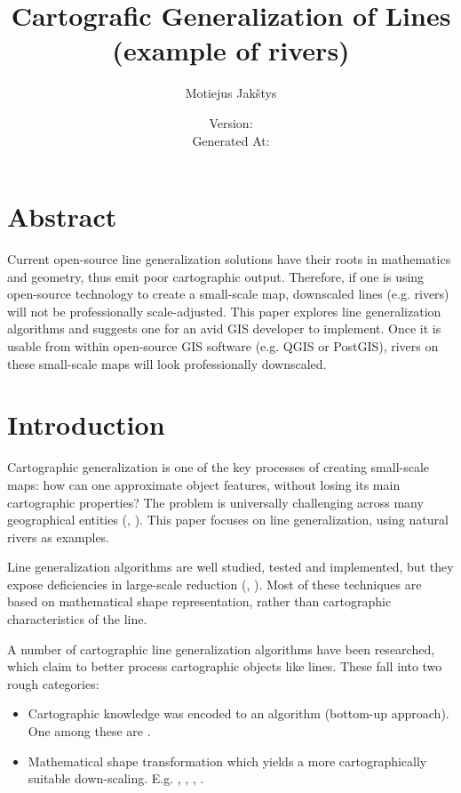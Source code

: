 \documentclass[a4paper]{article}
\title{
    Cartografic Generalization of Lines \\
    (example of rivers) \\ \vspace{4mm}
}
\author{Motiejus Jakštys}
\date{
    \vspace{10mm}
    Version: \VCDescribe \\ \vspace{4mm}
    Generated At: \GeneratedAt
}
\begin{document}
\maketitle

\newpage

\section{Abstract}
\label{sec:abstract}

Current open-source line generalization solutions have their roots in
mathematics and geometry, thus emit poor cartographic output. Therefore, if one
is using open-source technology to create a small-scale map, downscaled lines
(e.g. rivers) will not be professionally scale-adjusted. This paper explores
line generalization algorithms and suggests one for an avid GIS developer to
implement. Once it is usable from within open-source GIS software (e.g. QGIS or
PostGIS), rivers on these small-scale maps will look professionally downscaled.

\section{Introduction}
\label{sec:introduction}

Cartographic generalization is one of the key processes of creating small-scale
maps: how can one approximate object features, without losing its main
cartographic properties? The problem is universally challenging across many
geographical entities (\cite{muller1991generalization},
\cite{mcmaster1992generalization}). This paper focuses on line generalization,
using natural rivers as examples.

Line generalization algorithms are well studied, tested and implemented, but
they expose deficiencies in large-scale reduction (\cite{monmonier1986toward},
\cite{mcmaster1993spatial}). Most of these techniques are based on mathematical
shape representation, rather than cartographic characteristics of the line.

A number of cartographic line generalization algorithms have been researched,
which claim to better process cartographic objects like lines. These fall into
two rough categories:
\begin{itemize}
    \item Cartographic knowledge was encoded to an algorithm (bottom-up
        approach). One among these are \cite{wang1998line}.
    \item Mathematical shape transformation which yields a more
        cartographically suitable down-scaling. E.g. \cite{jiang2003line},
        \cite{dyken2009simultaneous}, \cite{mustafa2006dynamic},
        \cite{nollenburg2008morphing}.
\end{itemize}
\end{document}
